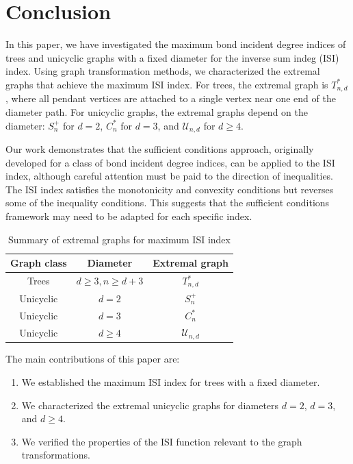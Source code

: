 \documentclass[12pt]{article}
\theoremstyle{definition}
\begin{document}
\section{Conclusion}

In this paper, we have investigated the maximum bond incident degree indices of trees and unicyclic graphs with a fixed diameter for the inverse sum indeg (ISI) index. Using graph transformation methods, we characterized the extremal graphs that achieve the maximum ISI index. For trees, the extremal graph is \(T_{n,d}^*\), where all pendant vertices are attached to a single vertex near one end of the diameter path. For unicyclic graphs, the extremal graphs depend on the diameter: \(S_n^+\) for \(d=2\), \(C_n^*\) for \(d=3\), and \(\mathcal{U}_{n,d}\) for \(d \geq 4\).

Our work demonstrates that the sufficient conditions approach, originally developed for a class of bond incident degree indices, can be applied to the ISI index, although careful attention must be paid to the direction of inequalities. The ISI index satisfies the monotonicity and convexity conditions but reverses some of the inequality conditions. This suggests that the sufficient conditions framework may need to be adapted for each specific index.

\begin{table}[h]
\centering
\caption{Summary of extremal graphs for maximum ISI index}
\begin{tabular}{|c|c|c|}
\hline
\textbf{Graph class} & \textbf{Diameter} & \textbf{Extremal graph} \\
\hline
Trees & \(d \geq 3, n \geq d+3\) & \(T_{n,d}^*\) \\
\hline
Unicyclic & \(d = 2\) & \(S_n^+\) \\
\hline
Unicyclic & \(d = 3\) & \(C_n^*\) \\
\hline
Unicyclic & \(d \geq 4\) & \(\mathcal{U}_{n,d}\) \\
\hline
\end{tabular}
\label{tab:summary}
\end{table}

The main contributions of this paper are:
\begin{enumerate}
\item We established the maximum ISI index for trees with a fixed diameter.
\item We characterized the extremal unicyclic graphs for diameters \(d=2\), \(d=3\), and \(d \geq 4\).
\item We verified the properties of the ISI function relevant to the graph transformations.
\end{enumerate}
\end{document}
